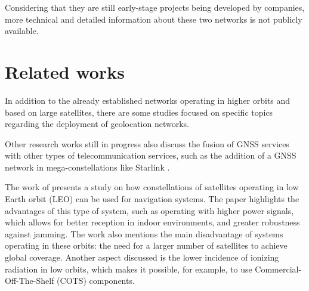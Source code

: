 
Considering that they are still early-stage projects being developed by companies, more technical and detailed information about these two networks is not publicly available.

\section{Related works}


In addition to the already established networks operating in higher orbits and based on large satellites, there are some studies focused on specific topics regarding the deployment of geolocation networks.

Other research works still in progress also discuss the fusion of GNSS services with other types of telecommunication services, such as the addition of a GNSS network in mega-constellations like Starlink \cite{iannucci2022}.



The work of \cite{reid2018} presents a study on how constellations of satellites operating in low Earth orbit (LEO) can be used for navigation systems. The paper highlights the advantages of this type of system, such as operating with higher power signals, which allows for better reception in indoor environments, and greater robustness against jamming. The work also mentions the main disadvantage of systems operating in these orbits: the need for a larger number of satellites to achieve global coverage. Another aspect discussed is the lower incidence of ionizing radiation in low orbits, which makes it possible, for example, to use Commercial-Off-The-Shelf (COTS) components.

